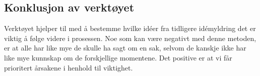 \subsection{Konklusjon av verktøyet}
Verktøyet hjelper til med å bestemme hvilke idéer fra tidligere idémyldring det er viktig å følge videre i prosessen. Noe som kan være negativt med denne metoden, er at alle har like mye de skulle ha sagt om en sak, selvom de kanskje ikke har like mye kunnskap om de forskjellige momentene. Det positive er at vi får prioritert årsakene i henhold til viktighet. 